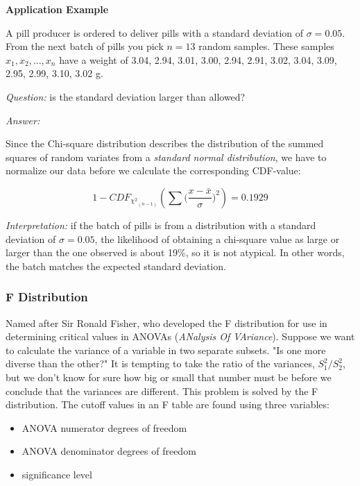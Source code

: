 \textbf{Application Example}

A pill producer is ordered to deliver pills with a standard deviation of $\sigma=0.05$. From the next batch of pills you pick $n=13$ random samples. These samples $x_1, x_2, . . . , x_n$ have a weight of
3.04, 2.94, 3.01, 3.00, 2.94, 2.91, 3.02, 3.04, 3.09, 2.95, 2.99, 3.10, 3.02 g.

\emph{Question:} is the standard deviation larger than allowed?

\emph{Answer:}

Since the Chi-square distribution describes the distribution of the summed squares of random variates from a \emph{standard normal distribution}, we have to normalize our data before we calculate the corresponding CDF-value:

\begin{equation}
  1 - CD{F_{{\chi ^2}_{(n - 1)}}}\left( {\sum {(\frac{{x - \bar x}}{\sigma }} {)^2}} \right) = 0.1929
\end{equation}

\emph{Interpretation:} if the batch of pills is from a distribution with a standard deviation of $\sigma=0.05$, the likelihood of obtaining a chi-square value as large or larger than the one observed is about 19\%, so it is not atypical. In other words, the batch matches the expected standard deviation.

\subsubsection{F Distribution}
Named after Sir Ronald Fisher, who developed the F distribution for use in determining critical values in ANOVAs (\emph{ANalysis Of VAriance}).
Suppose we want to calculate the variance of a variable in two separate subsets. "Is one more diverse than the other?" It is tempting to take the ratio of the variances, $S_1^2 / S_2^2$, but we don't know for sure how big or small that number must be before we conclude that the variances are different. This problem is solved by the F distribution. The cutoff values in an F table are found using three variables:

\begin{itemize}
  \item ANOVA numerator degrees of freedom
  \item ANOVA denominator degrees of freedom
  \item significance level
\end{itemize}

